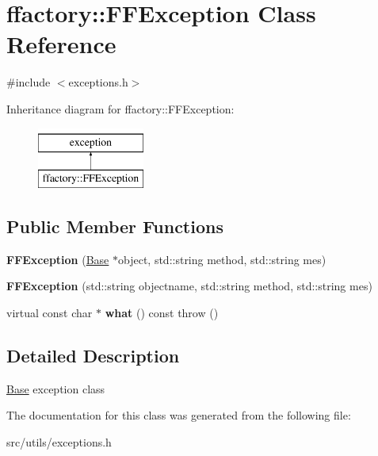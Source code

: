 \hypertarget{classffactory_1_1_f_f_exception}{\section{ffactory\-:\-:F\-F\-Exception Class Reference}
\label{classffactory_1_1_f_f_exception}
}


{\ttfamily \#include $<$exceptions.\-h$>$}

Inheritance diagram for ffactory\-:\-:F\-F\-Exception\-:\begin{figure}[H]
\begin{center}
\leavevmode
\includegraphics[height=2.000000cm]{classffactory_1_1_f_f_exception}
\end{center}
\end{figure}
\subsection*{Public Member Functions}
\begin{DoxyCompactItemize}
\item 
\hypertarget{classffactory_1_1_f_f_exception_a6cb0d563a738e95ccca6512509f21b7f}{{\bfseries F\-F\-Exception} (\hyperlink{classffactory_1_1_base}{Base} $\ast$object, std\-::string method, std\-::string mes)}\label{classffactory_1_1_f_f_exception_a6cb0d563a738e95ccca6512509f21b7f}

\item 
\hypertarget{classffactory_1_1_f_f_exception_aea73dd281daa06ec098b42e6cf0b8927}{{\bfseries F\-F\-Exception} (std\-::string objectname, std\-::string method, std\-::string mes)}\label{classffactory_1_1_f_f_exception_aea73dd281daa06ec098b42e6cf0b8927}

\item 
\hypertarget{classffactory_1_1_f_f_exception_af4ce78022b1896266b1e9de8784d92f3}{virtual const char $\ast$ {\bfseries what} () const   throw ()}\label{classffactory_1_1_f_f_exception_af4ce78022b1896266b1e9de8784d92f3}

\end{DoxyCompactItemize}


\subsection{Detailed Description}
\hyperlink{classffactory_1_1_base}{Base} exception class 

The documentation for this class was generated from the following file\-:\begin{DoxyCompactItemize}
\item 
src/utils/exceptions.\-h\end{DoxyCompactItemize}

